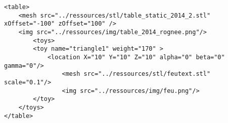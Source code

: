 \begin{lstlisting}[caption=Exemple de descritption d'une table, label=desctable]
<table>
    <mesh src="../ressources/stl/table_static_2014_2.stl" xOffset="-100" zOffset="100" />
    <img src="../ressources/img/table_2014_rognee.png"/>
        <toys>
        <toy name="triangle1" weight="170" >
            <location X="10" Y="10" Z="10" alpha="0" beta="0" gamma="0"/>
                <mesh src="../ressources/stl/feutext.stl" scale="0.1"/>
                <img src="../ressources/img/feu.png"/>
        </toy>
    </toys>
</table>
\end{lstlisting}